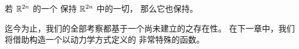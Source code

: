 \begin{corollary}\label{cor:homeomorphism-preserving-capacity}
若 $\mathbb{R}^{2n}$ 的一个\trHomeomorphism{}%
保持 $\mathbb{R}^{2n}$ 中\trOpenSet{}的一切\trCapacity，%
那么它也保持\trLebesgue{}\trMeasure。
\end{corollary}

迄今为止，我们的全部考察都基于一个尚未建立的\trCapacity{}之存在性。%
在下一章中，我们将借助\trHamiltonianSystem{}构造一个以动力学方式定义的%
非常特殊的\trCapacity{}函数。

